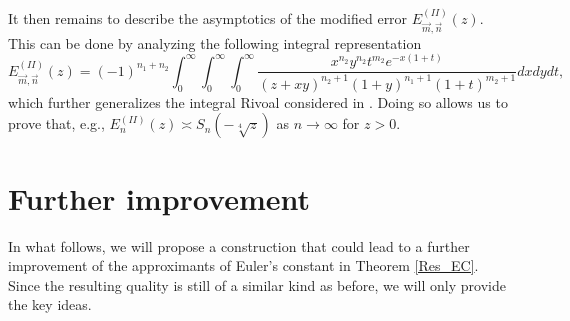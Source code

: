 \documentclass[a4paper,12pt,oneside]{article}
\theoremstyle{definition}
\begin{document}
It then remains to describe the asymptotics of the modified error $E_{\vec{m},\vec{n}}^{(II)}(z)$. This can be done by analyzing the following integral representation
$$E_{\vec{m},\vec{n}}^{(II)}(z) = (-1)^{n_1+n_2} \int_0^\infty\int_0^\infty\int_0^\infty  \frac{x^{n_2} y^{n_2} t^{m_2} e^{-x(1+t)} }{(z+xy)^{n_2+1}(1+y)^{n_1+1}(1+t)^{m_2+1}} dx dy dt,$$
which further generalizes the integral Rivoal considered in \cite[Lemma 1]{Riv}. Doing so allows us to prove that, e.g., $E_n^{(II)}(z) \asymp S_n(-\sqrt[4]{z})$ as $n\to\infty$ for $z>0$.


\section{Further improvement}

In what follows, we will propose a construction that could lead to a further improvement of the approximants of Euler's constant in Theorem \ref{Res_EC}. Since the resulting quality is still of a similar kind as before, we will only provide the key ideas.
\medbreak
\end{document}
